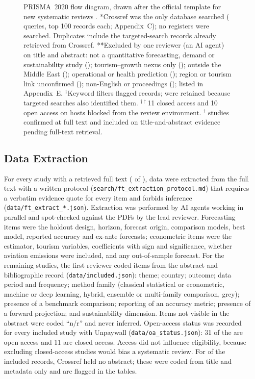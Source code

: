 \documentclass[11pt,a4paper]{article}
\begin{document}
\begin{figure}[t]
\centering

\caption{PRISMA~2020 flow diagram, drawn after the official template for new systematic reviews \citep{Page2021}. *Crossref was the only database searched (\Nqueries{} queries, top 100 records each; Appendix~C); no registers were searched. Duplicates include the \Notherreinst{} targeted-search records already retrieved from Crossref. **Excluded by one reviewer (an AI agent) on title and abstract: not a quantitative forecasting, demand or sustainability study (\Nenotq{}); tourism--growth nexus only (\Negrowth{}); outside the Middle East (\Negeo{}); operational or health prediction (\Neoper{}); region or tourism link unconfirmed (\Neundet{}); non-English or proceedings (\Nelang{}); listed in Appendix~E. $^{\dagger}$Keyword filters flagged \Nautoexcl{} records; \Notherreinst{} were retained because targeted searches also identified them. $^{\dagger\dagger}$11 closed access and 10 open access on hosts blocked from the review environment. $^{\ddagger}$\Nftconf{} studies confirmed at full text and \Nabsonly{} included on title-and-abstract evidence pending full-text retrieval.}\label{fig:prisma}
\end{figure}


\subsection{Data Extraction}
For every study with a retrieved full text (\Nftconf{} of \Nincluded{}), data were extracted from the full text with a written protocol (\texttt{search/ft\_extraction\_protocol.md}) that requires a verbatim evidence quote for every item and forbids inference (\texttt{data/ft\_extract\_*.json}). Extraction was performed by AI agents working in parallel and spot-checked against the PDFs by the lead reviewer. Forecasting items were the holdout design, horizon, forecast origin, comparison models, best model, reported accuracy and ex-ante forecasts; econometric items were the estimator, tourism variables, coefficients with sign and significance, whether aviation emissions were included, and any out-of-sample forecast. For the remaining studies, the first reviewer coded items from the abstract and bibliographic record (\texttt{data/included.json}): theme; country; outcome; data period and frequency; method family (classical statistical or econometric, machine or deep learning, hybrid, ensemble or multi-family comparison, grey); presence of a benchmark comparison; reporting of an accuracy metric; presence of a forward projection; and sustainability dimension. Items not visible in the abstract were coded ``n/r'' and never inferred. Open-access status was recorded for every included study with Unpaywall (\texttt{data/oa\_status.json}): 31 of the \Nincluded{} are open access and 11 are closed access. Access did not influence eligibility, because excluding closed-access studies would bias a systematic review. For \Nnnoabs{} of the \Nincluded{} included records, Crossref held no abstract; these were coded from title and metadata only and are flagged in the tables.
\end{document}
